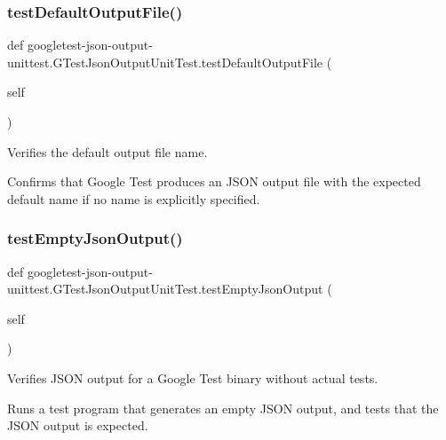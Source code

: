 \subsubsection{\texorpdfstring{testDefaultOutputFile()}{testDefaultOutputFile()}}
{\footnotesize\ttfamily def googletest-\/json-\/output-\/unittest.\+G\+Test\+Json\+Output\+Unit\+Test.\+test\+Default\+Output\+File (\begin{DoxyParamCaption}\item[{}]{self }\end{DoxyParamCaption})}

\begin{DoxyVerb}Verifies the default output file name.

Confirms that Google Test produces an JSON output file with the expected
default name if no name is explicitly specified.
\end{DoxyVerb}
 \mbox{\label{classgoogletest-json-output-unittest_1_1_g_test_json_output_unit_test_ad8f3712a87e4c54bb475103793975482}} 
\subsubsection{\texorpdfstring{testEmptyJsonOutput()}{testEmptyJsonOutput()}}
{\footnotesize\ttfamily def googletest-\/json-\/output-\/unittest.\+G\+Test\+Json\+Output\+Unit\+Test.\+test\+Empty\+Json\+Output (\begin{DoxyParamCaption}\item[{}]{self }\end{DoxyParamCaption})}

\begin{DoxyVerb}Verifies JSON output for a Google Test binary without actual tests.

Runs a test program that generates an empty JSON output, and
tests that the JSON output is expected.
\end{DoxyVerb}
 \mbox{\label{classgoogletest-json-output-unittest_1_1_g_test_json_output_unit_test_abc55ae0ca4d9b3d265b10bbbcc6e720e}} 

